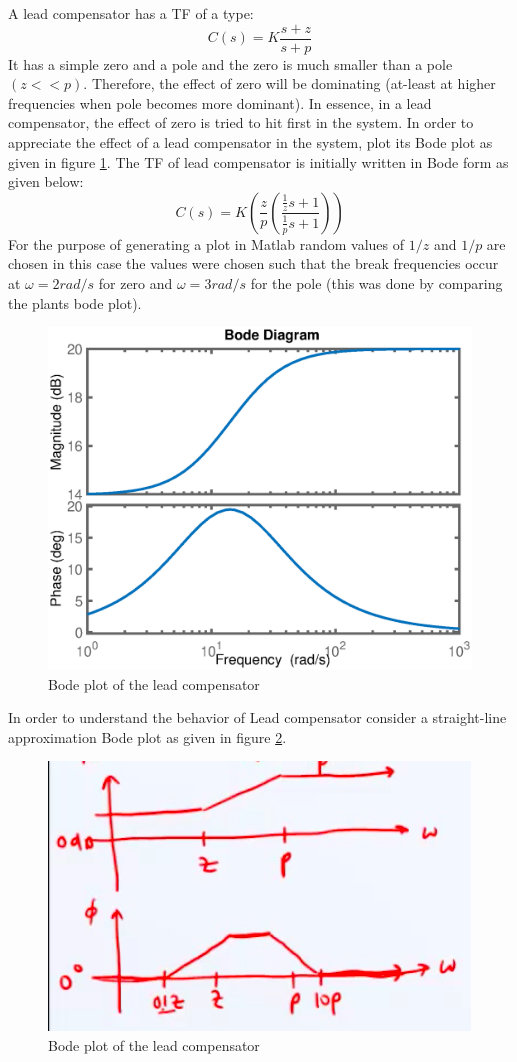 A lead compensator has a TF of a type:
\begin{equation} \label{Eq_TF_LC}
	C(s) = K \frac{s + z}{s + p}
\end{equation}
It has a simple zero and a pole and the zero is much smaller than a pole $(z << p)$. Therefore, the effect of zero will be dominating (at-least at higher frequencies when pole becomes more dominant). In essence, in a lead compensator, the effect of zero is tried to hit first in the system. In order to appreciate the effect of a lead compensator in the system, plot its Bode plot as given in figure \ref{Fig_FreqCDLeadBode}. The TF of lead compensator is initially written in Bode form as given below:
\begin{equation}
	C(s) = K \left(\frac{z}{p} \left( \frac{\frac{1}{z}s+1}{\frac{1}{p}s+1} \right) \right)
\end{equation}
For the purpose of generating a plot in Matlab random values of $1/z$ and $1/p$ are chosen in this case the values were chosen such that the break frequencies occur at $\omega = 2 rad/s$ for zero and $\omega = 3 rad/s$ for the pole (this was done by comparing the plants bode plot).
\begin{figure}[h!]
	\centering
	\includegraphics[width=0.8\linewidth]{Bilder/FreqCDLeadBode.eps}
	\caption{Bode plot of the lead compensator}
	\label{Fig_FreqCDLeadBode}
\end{figure}
\newpage
In order to understand the behavior of Lead compensator consider a straight-line approximation Bode plot as given in figure \ref{Fig_FreqCDLeadBodeSL}.
\begin{figure}[h!]
	\centering
	\includegraphics[width=0.8\linewidth]{Bilder/FreqCDLeadBodeSL}
	\caption{Bode plot of the lead compensator}
	\label{Fig_FreqCDLeadBodeSL}
\end{figure}

